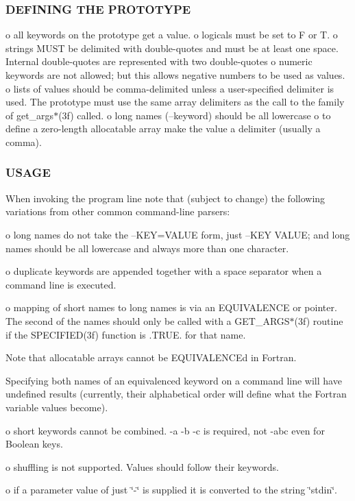 \subsubsection*{D\+E\+F\+I\+N\+I\+NG T\+HE P\+R\+O\+T\+O\+T\+Y\+PE}

o all keywords on the prototype get a value. o logicals must be set to F or T. o strings M\+U\+ST be delimited with double-\/quotes and must be at least one space. Internal double-\/quotes are represented with two double-\/quotes o numeric keywords are not allowed; but this allows negative numbers to be used as values. o lists of values should be comma-\/delimited unless a user-\/specified delimiter is used. The prototype must use the same array delimiters as the call to the family of get\+\_\+args$\ast$(3f) called. o long names (--keyword) should be all lowercase o to define a zero-\/length allocatable array make the value a delimiter (usually a comma). \subsubsection*{U\+S\+A\+GE}

When invoking the program line note that (subject to change) the following variations from other common command-\/line parsers\+:

o long names do not take the --K\+EY=V\+A\+L\+UE form, just --K\+EY V\+A\+L\+UE; and long names should be all lowercase and always more than one character.

o duplicate keywords are appended together with a space separator when a command line is executed.

o mapping of short names to long names is via an E\+Q\+U\+I\+V\+A\+L\+E\+N\+CE or pointer. The second of the names should only be called with a G\+E\+T\+\_\+\+A\+R\+G\+S$\ast$(3f) routine if the S\+P\+E\+C\+I\+F\+I\+E\+D(3f) function is .T\+R\+UE. for that name.

Note that allocatable arrays cannot be E\+Q\+U\+I\+V\+A\+L\+E\+N\+C\+Ed in Fortran.

Specifying both names of an equivalenced keyword on a command line will have undefined results (currently, their alphabetical order will define what the Fortran variable values become).

o short keywords cannot be combined. -\/a -\/b -\/c is required, not -\/abc even for Boolean keys.

o shuffling is not supported. Values should follow their keywords.

o if a parameter value of just \char`\"{}-\/\char`\"{} is supplied it is converted to the string \char`\"{}stdin\char`\"{}.


